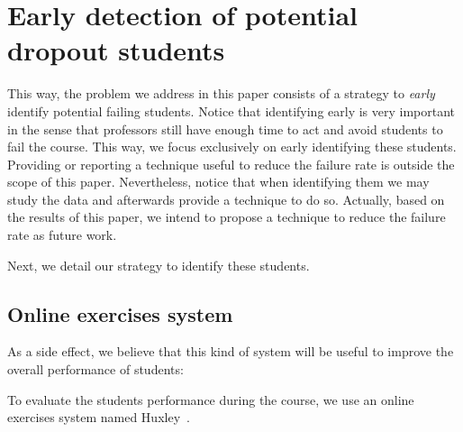 \section{Early detection of potential dropout students}

\label{sec:strategy}

This way, the problem we address in this paper consists of a strategy to \textit{early} identify potential failing students. Notice that identifying early is very important in the sense that professors still have enough time to act and avoid students to fail the course. This way, we focus exclusively on early identifying these students. Providing or reporting a technique useful to reduce the failure rate is outside the scope of this paper. Nevertheless, notice that when identifying them we may study the data and afterwards provide a technique to do so. Actually, based on the results of this paper, we intend to propose a technique to reduce the failure rate as future work.

Next, we detail our strategy to identify these students.

\subsection{Online exercises system}

As a side effect, we believe that this kind of system will be useful to improve the overall performance of students:




To evaluate the students performance during the course, we use an online exercises system named Huxley~\cite{}. 

